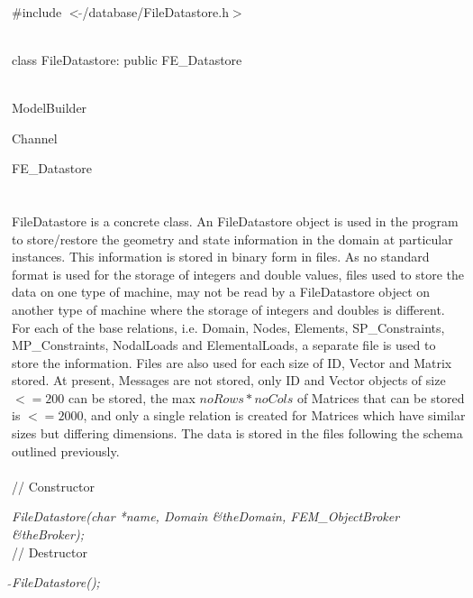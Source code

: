 
   \\
\#include $<\tilde{ }$/database/FileDatastore.h$>$  


  \\
class FileDatastore: public FE\_Datastore 


 \\
ModelBuilder 

Channel 

\indent\indent FE\_Datastore \\
\indent\indent{} \\

  \\
\indent FileDatastore is a concrete class. An FileDatastore object is
used in the program to store/restore the geometry and state information 
in the domain at particular instances. This information is stored in
binary form in files. As no standard format is used for the storage of
integers and double values, files used to store the data on one type
of machine, may not be read by a FileDatastore object on another type
of machine where the storage of integers and doubles is different. \\

For each of the base relations, i.e. Domain, Nodes, Elements,
SP\_Constraints, MP\_Constraints, NodalLoads and ElementalLoads, a
separate file is used to store the information. Files are also used
for each size of ID, Vector and Matrix stored. At present, Messages
are not stored, only ID and Vector objects of size $<= 200$ can be
stored, the max $noRows * noCols$ of Matrices that can be stored
is $<= 2000$, and only a single relation is created for Matrices which
have similar sizes but differing dimensions. The data is stored in the
files following the schema outlined previously.\\


 \\
// Constructor 

{\em FileDatastore(char *name, Domain \&theDomain, FEM\_ObjectBroker \&theBroker);}  \\ 

// Destructor 

{\em $\tilde{ }$FileDatastore();}\\ 

